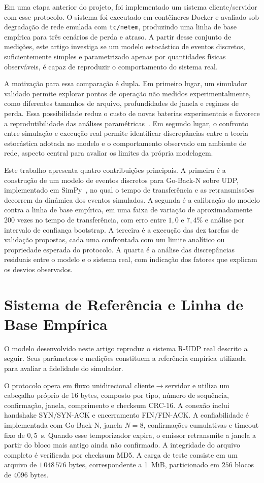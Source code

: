 \documentclass[12pt]{article}
\begin{document}
Em uma etapa anterior do projeto, foi implementado um sistema cliente/servidor com esse
protocolo. O sistema foi executado em contêineres Docker e avaliado sob degradação de rede
emulada com \texttt{tc/netem}, produzindo uma linha de base empírica para três cenários de
perda e atraso. A partir desse conjunto de medições, este artigo investiga se um modelo
estocástico de eventos discretos, suficientemente simples e parametrizado apenas por
quantidades físicas observáveis, é capaz de reproduzir o comportamento do sistema real.

A motivação para essa comparação é dupla. Em primeiro lugar, um simulador validado permite
explorar pontos de operação não medidos experimentalmente, como diferentes tamanhos de
arquivo, profundidades de janela e regimes de perda. Essa possibilidade reduz o custo de
novas baterias experimentais e favorece a reprodutibilidade das análises
paramétricas~\cite{law2015,jain1991}. Em segundo lugar, o confronto entre simulação e
execução real permite identificar discrepâncias entre a teoria estocástica adotada no
modelo e o comportamento observado em ambiente de rede, aspecto central para avaliar os
limites da própria modelagem.

Este trabalho apresenta quatro contribuições principais. A primeira é a construção de um
modelo de eventos discretos para Go-Back-N sobre UDP, implementado em SimPy~\cite{simpy},
no qual o tempo de transferência e as retransmissões decorrem da dinâmica dos eventos
simulados. A segunda é a calibração do modelo contra a linha de base empírica, em uma faixa
de variação de aproximadamente 200 vezes no tempo de transferência, com erro entre
$1{,}0$ e $7{,}4\%$ e análise por intervalo de confiança bootstrap. A terceira é a execução
das dez tarefas de validação propostas, cada uma confrontada com um limite analítico ou
propriedade esperada do protocolo. A quarta é a análise das discrepâncias residuais entre
o modelo e o sistema real, com indicação dos fatores que explicam os desvios observados.

\section{Sistema de Referência e Linha de Base Empírica}
\label{sec:referencia}

O modelo desenvolvido neste artigo reproduz o sistema R-UDP real descrito a seguir. Seus
parâmetros e medições constituem a referência empírica utilizada para avaliar a fidelidade
do simulador.

O protocolo opera em fluxo unidirecional cliente$\rightarrow$servidor e utiliza um
cabeçalho próprio de 16 bytes, composto por tipo, número de sequência, confirmação, janela,
comprimento e checksum CRC-16. A conexão inclui handshake SYN/SYN-ACK e encerramento
FIN/FIN-ACK. A confiabilidade é implementada com Go-Back-N, janela $N = 8$, confirmações
cumulativas e timeout fixo de $0{,}5$~s. Quando esse temporizador expira, o emissor
retransmite a janela a partir do bloco mais antigo ainda não confirmado. A integridade do
arquivo completo é verificada por checksum MD5. A carga de teste consiste em um arquivo de
$1\,048\,576$ bytes, correspondente a 1~MiB, particionado em $256$ blocos de $4096$ bytes.
\end{document}
